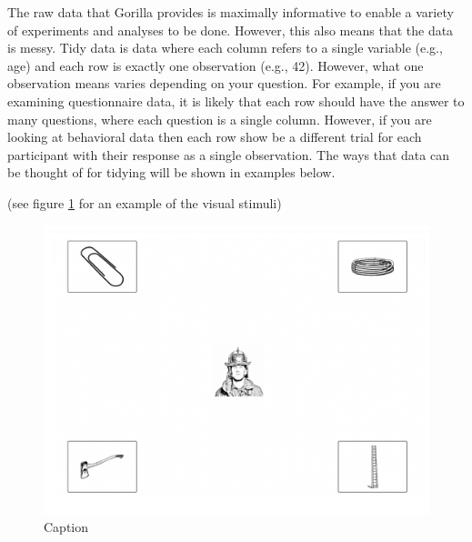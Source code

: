 The raw data that Gorilla provides is maximally informative to enable a variety of experiments and analyses to be done. However, this also means that the data is messy. Tidy data is data where each column refers to a single variable (e.g., age) and each row is exactly one observation (e.g., 42). However, what one observation means varies depending on your question. For example, if you are examining questionnaire data, it is likely that each row should have the answer to many questions, where each question is a single column. However, if you are looking at behavioral data then each row show be a different trial for each participant with their response as a single observation. The ways that data can be thought of for tidying will be shown in examples below.



(see figure \ref{fig:porretta_visual_stimuli} for an example of the visual stimuli)

\begin{figure}[h]
    \centering
    \includegraphics[scale=.075]{figures/porretta_e_al_vi.png}
    \caption{Caption}
    \label{fig:porretta_visual_stimuli}
\end{figure}
